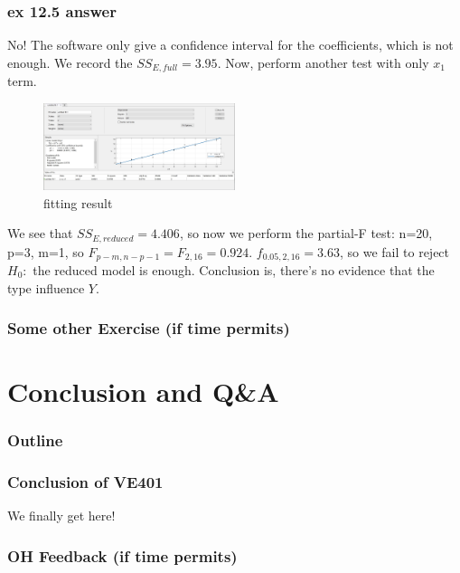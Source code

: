\documentclass{beamer}
\begin{document}
\begin{frame}
    \frametitle{ex 12.5 answer}
    No! The software only give a confidence interval for the coefficients, which is not enough. We record the $SS_{E,full}=3.95$. Now, perform another test with only $x_1$ term.\par
    \begin{figure}[H]
        \centering
        \includegraphics[width=0.5\textwidth,height=0.25\textwidth]{ex12_5_2.jpg}
        \caption{fitting result}
    \end{figure}\par
    We see that $SS_{E,reduced}=4.406$, so now we perform the partial-F test: n=20, p=3, m=1, so $F_{p-m,n-p-1}=F_{2,16}=0.924$. $f_{0.05,2,16}=3.63$, so we fail to reject $H_0:$ the reduced model is enough. Conclusion is, there's no evidence that the type influence $Y$.

\end{frame}

\begin{frame}
    \frametitle{Some other Exercise (if time permits)}

    

\end{frame}

\section{Conclusion and Q\&A}
\begin{frame}
    \frametitle{Outline}
    \tableofcontents[currentsection]
\end{frame}

\begin{frame}
    \frametitle{Conclusion of VE401}

    We finally get here!

\end{frame}

\begin{frame}
    \frametitle{OH Feedback (if time permits)}

    

\end{frame}
\end{document}
